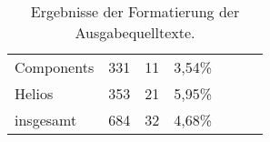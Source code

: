 \begin{table}[tbh]
  \footnotesize
  \begin{tabu} to 
    \midrule
     &  &  & \\ %
    \midrule
    Components & 331 & 11 & 3,54\% \\ %
    Helios     & 353 & 21 & 5,95\% \\ %
    insgesamt  & 684 & 32 & 4,68\% \\ %
    \midrule
  \end{tabu}
  \caption{Ergebnisse der Formatierung der Ausgabequelltexte.}
  \label{tab:results-formatting}
\end{table}
